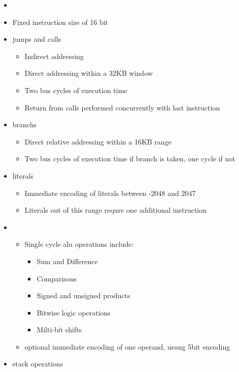 \begin{description}[style=nextline]
\item[Instruction set:]
  \begin{itemize}
  \item[]
  \item Fixed instruction size of 16 bit
  \item \Glspl{jump} and \glspl{call}
    \begin{itemize}
    \item Indirect addressing
    \item Direct addressing within a 32KB window
    \item Two bus cycles of execution time
    \item Return from \glspl{call} performed concurrently with last instruction
    \end{itemize}
  \item \Glspl{branch}
    \begin{itemize}
    \item Direct relative addressing within a 16KB range
    \item Two bus cycles of execution time if branch is taken, one cycle if not
    \end{itemize}         
  \item \Glspl{literal}
    \begin{itemize}
    \item Immediate encoding of literals between -2048 and 2047
    \item Literals out of this range requre one additional instruction
    \end{itemize}
  \item {}
    \begin{itemize}
    \item Single cycle \Gls{alu} operations include:
      \begin{itemize}
      \item Sum and Difference
      \item Comparisons
      \item Signed and unsigned products
      \item Bitwise logic operations
      \item Milti-bit shifts
     \end{itemize}
    \item optional immediate encoding of one operand, usung 5bit encoding 
    \end{itemize}
  \item \Gls{stack} operations

\end{itemize}
\end{description}
